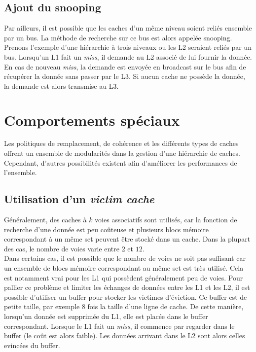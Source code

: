 \subsection{Ajout du snooping}
 Par ailleurs, il est possible que les caches d'un même niveau soient reliés ensemble par un bus. La méthode de recherche sur ce bus est alors appelée snooping. Prenons l'exemple d'une hiérarchie à trois niveaux ou les L2 seraient reliés par un bus. Lorsqu'un L1 fait un \textit{miss}, il demande au L2 associé de lui fournir la donnée. En cas de nouveau \textit{miss}, la demande est envoyée en broadcast sur le bus afin de récupérer la donnée sans passer par le L3. Si aucun cache ne possède la donnée, la demande est alors transmise au L3.

\newpage
\section{Comportements spéciaux}
Les politiques de remplacement, de cohérence et les différents types de caches offrent un ensemble de modularités dans la gestion d'une hiérarchie de caches. Cependant, d'autres possibilités existent afin d'améliorer les performances de l'ensemble.

\subsection{Utilisation d'un \textit{victim cache}}
Généralement, des caches à $k$ voies associatifs sont utilisés, car la fonction de recherche d'une donnée est peu coûteuse et plusieurs blocs mémoire correspondant à un même set peuvent être stocké dans un cache. Dans la plupart des cas, le nombre de voies varie entre $2$ et $12$. \\

Dans certains cas, il est possible que le nombre de voies ne soit pas suffisant car un ensemble de blocs mémoire correspondant au même set est très utilisé. Cela est notamment vrai pour les L1 qui possèdent généralement peu de voies. Pour pallier ce problème et limiter les échanges de données entre les L1 et les L2, il est possible d'utiliser un buffer pour stocker les victimes d'éviction. Ce buffer est de petite taille, par exemple $8$ fois la taille d'une ligne de cache. De cette manière, lorsqu'un donnée est supprimée du L1, elle est placée dans le buffer correspondant. Lorsque le L1 fait un \textit{miss}, il commence par regarder dans le buffer (le coût est alors faible). Les données arrivant dans le L2 sont alors celles evincées du buffer.

